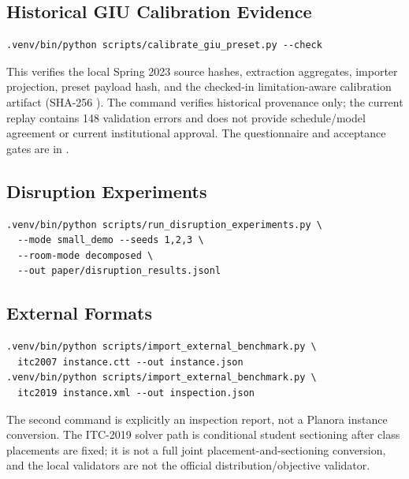 \subsection*{Historical GIU Calibration Evidence}
\begingroup\scriptsize
\begin{verbatim}
.venv/bin/python scripts/calibrate_giu_preset.py --check
\end{verbatim}
\endgroup
This verifies the local Spring 2023 source hashes, extraction aggregates, importer projection, preset payload hash, and the checked-in limitation-aware calibration artifact (SHA-256 ).
The command verifies historical provenance only; the current replay contains 148 validation errors and does not provide schedule/model agreement or current institutional approval.
The questionnaire and acceptance gates are in .

\subsection*{Disruption Experiments}
\begingroup\scriptsize
\begin{verbatim}
.venv/bin/python scripts/run_disruption_experiments.py \
  --mode small_demo --seeds 1,2,3 \
  --room-mode decomposed \
  --out paper/disruption_results.jsonl
\end{verbatim}
\endgroup

\subsection*{External Formats}
\begingroup\scriptsize
\begin{verbatim}
.venv/bin/python scripts/import_external_benchmark.py \
  itc2007 instance.ctt --out instance.json
.venv/bin/python scripts/import_external_benchmark.py \
  itc2019 instance.xml --out inspection.json
\end{verbatim}
\endgroup
The second command is explicitly an inspection report, not a Planora instance conversion.
The ITC-2019 solver path is conditional student sectioning after class placements are fixed; it is not a full joint placement-and-sectioning conversion, and the local validators are not the official distribution/objective validator.


